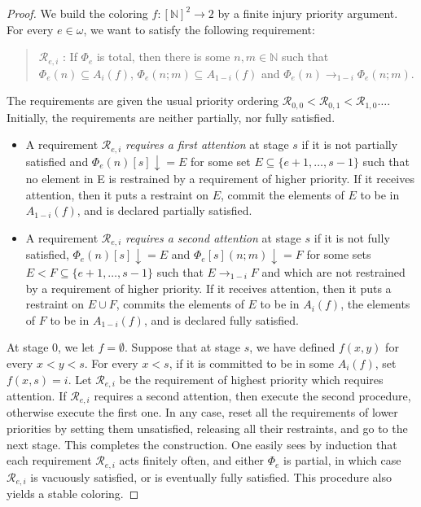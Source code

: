 \documentclass{article}
\def\N{\mathbb{N}}
\newcommand{\R}{\mathcal{R}}
\numberwithin{theorem}{section}
\theoremstyle{definition}
\begin{document}
\begin{proof}
    We build the coloring $f : [\N]^2 \to 2$ by a finite injury priority argument. For
every $e \in \omega$, we want to satisfy the following requirement:
\begin{quote}
    $\R_{e,i}$ : If $\Phi_e$ is total, then there is some $n, m \in \N$ such that 
$\Phi_e(n) \subseteq A_i(f)$, $\Phi_e(n; m) \subseteq A_{1-i}(f)$ and $\Phi_e(n) \to_{1-i} \Phi_e(n; m)$.
\end{quote}

The requirements are given the usual priority ordering $\R_{0,0} < \R_{0,1} < \R_{1,0} \dots$. Initially, the
requirements are neither partially, nor fully satisfied.
\begin{itemize}
    \item A requirement $\R_{e,i}$ \emph{requires a first attention} at stage $s$ if it is not partially
satisfied and $\Phi_{e}(n)[s] \downarrow= E$ for some set $E \subseteq \{e + 1, \dots , s - 1\}$ such that
no element in E is restrained by a requirement of higher priority. If it
receives attention, then it puts a restraint on $E$, commit the elements of $E$
to be in $A_{1-i}(f)$, and is declared partially satisfied.
    \item  A requirement $\R_{e,i}$ \emph{requires a second attention} at stage $s$ if it is not fully
satisfied, $\Phi_{e}(n)[s] \downarrow= E$ and $\Phi_{e}[s](n; m) \downarrow= F$ for some sets $E < F \subseteq
\{e + 1, \dots , s - 1\}$ such that $E \to_{1-i} F$ and which are not restrained by
a requirement of higher priority. If it receives attention, then it puts a
restraint on $E \cup F$, commits the elements of $E$ to be in $A_{i}(f)$, the elements
of $F$ to be in $A_{1-i}(f)$, and is declared fully satisfied.
\end{itemize}
At stage $0$, we let $f = \emptyset$. Suppose that at stage $s$, we have defined $f(x, y)$ for every
$x < y < s$. For every $x < s$, if it is committed to be in some $A_i(f)$, set $f(x, s) = i$. Let $\R_{e,i}$ be the requirement of highest priority which
requires attention. If $\R_{e,i}$ requires a second attention, then execute the second
procedure, otherwise execute the first one. In any case, reset all the requirements
of lower priorities by setting them unsatisfied, releasing all their restraints, and go
to the next stage. This completes the construction. One easily sees by induction that each requirement $\R_{e,i}$ acts finitely often, and either $\Phi_e$ is partial, in which case $\R_{e,i}$ is vacuously satisfied, or is eventually fully satisfied. This
procedure also yields a stable coloring. 
\end{proof}
\end{document}
